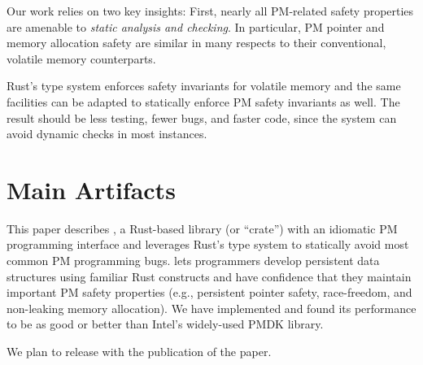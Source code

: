\documentclass[pageno]{jpaper}
\theoremstyle{invar}
\theoremstyle{goal}
\begin{document}
Our work relies on two key insights: First, nearly all PM-related safety
properties are amenable to \emph{static analysis and checking}.  In particular, PM pointer and
memory allocation safety are similar in many respects to their conventional,
volatile memory counterparts.

Rust's type system enforces safety invariants for volatile memory and the same
facilities can be adapted to statically enforce PM safety invariants as well.
The result should be less testing, fewer bugs, and faster code, since the
system can avoid dynamic checks in most instances.

\section{Main Artifacts}
\label{sec:main-artifacts}

This paper describes \this{}, a Rust-based library (or ``crate'') with an idiomatic PM
programming interface and leverages Rust’s type system to statically avoid most
common PM programming bugs.
\This{} lets programmers develop persistent data structures using familiar Rust
constructs and have confidence that they maintain important PM safety
properties (e.g., persistent pointer safety, race-freedom, and non-leaking memory allocation).
We have implemented \this{} and found its
performance to be as good or better than Intel's widely-used PMDK library.

We plan to release \this{} with the publication of the paper.


\newcommand{\Dynamic}{D}
\newcommand{\Static}{S}
\newcommand{\Manual}{M}
\end{document}
